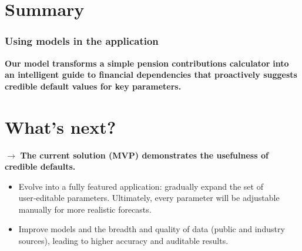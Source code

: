 \section{Summary}

\begin{frame}
  \frametitle{Using models in the application}
  \textbf{Our model transforms a simple pension contributions calculator}
  \textbf{into an intelligent guide to financial dependencies that proactively suggests}
  \textbf{credible default values for key parameters.}
  \\
  \pause
\end{frame}

\section{What’s next?}

\begin{frame}
  $\rightarrow$ \textbf{The current solution (MVP) demonstrates the usefulness of credible defaults.}
  \pause
  \begin{itemize}
    \item Evolve into a fully featured application: gradually expand the set of user‑editable parameters.
          Ultimately, every parameter will be adjustable manually for more realistic forecasts.
    \pause
    \item Improve models and the breadth and quality of data (public and industry sources),
          leading to higher accuracy and auditable results.
  \end{itemize}
\end{frame}
